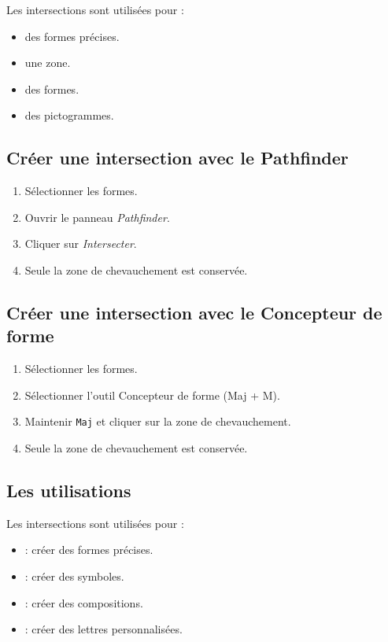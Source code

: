 Les intersections sont utilisées pour :

\begin{itemize}
    \item {} des formes précises.
    \item {} une zone.
    \item {} des formes.
    \item {} des pictogrammes.
\end{itemize}

\subsection{Créer une intersection avec le Pathfinder}

\begin{enumerate}
    \item Sélectionner les formes.
    \item Ouvrir le panneau \emph{Pathfinder}.
    \item Cliquer sur \emph{Intersecter}.
    \item Seule la zone de chevauchement est conservée.
\end{enumerate}

\subsection{Créer une intersection avec le Concepteur de forme}

\begin{enumerate}
    \item Sélectionner les formes.
    \item Sélectionner l'outil Concepteur de forme (Maj + M).
    \item Maintenir \texttt{Maj} et cliquer sur la zone de chevauchement.
    \item Seule la zone de chevauchement est conservée.
\end{enumerate}

\subsection{Les utilisations}

Les intersections sont utilisées pour :

\begin{itemize}
    \item {} : créer des formes précises.
    \item {} : créer des symboles.
    \item {} : créer des compositions.
    \item {} : créer des lettres personnalisées.
\end{itemize}

